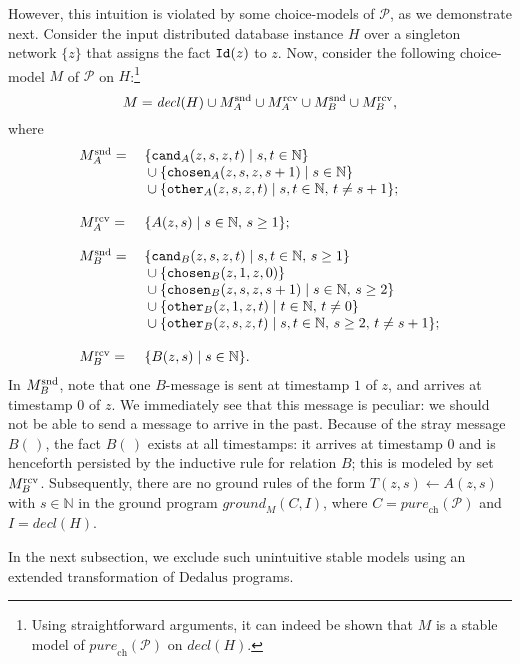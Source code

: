 \documentclass{tlp}
\newcommand{\langname}[1]{\text{#1}}  \newcommand{\pred}[1]{\mathtt{#1}}  \newcommand{\fname}[1]{\mathit{#1}}  \newcommand{\sq}[1]{`{#1}'}
\newcommand{\dedalus}{\langname{Dedalus}}
\newcommand{\Nat}{\mathbb{N}}  \newcommand{\len}[1]{|#1|} \newcommand{\rom}[1]{\text{\emph{(#1)}}} \newcommand{\romI}{\rom i}
\newcommand{\ded}{\mathcal{P}}
\newcommand{\ntup}{(\,)}
\newcommand{\grp}[3]{\fname{ground}_{#1}(#2,#3)}
\newcommand{\chosen}{\pred{chosen}}
\newcommand{\other}{\pred{other}}
\newcommand{\cand}{\pred{cand}}
\newcommand{\purech}[1]{\fname{pure}_{\mathrm{ch}}(#1)}
\newcommand{\decl}[1]{\fname{decl}(#1)}
\begin{document}
However, this intuition is violated by some choice-models of $\ded$,
as we demonstrate next. Consider the input distributed database instance
$H$ over a singleton network $\{z\}$ that assigns the fact $\relid(z)$
to $z$. Now, consider the following choice-model $M$ of $\ded$
on $H$:\footnote{Using straightforward arguments, it can indeed be shown that $M$
is a stable model of $\purech{\ded}$ on $\decl H$.}
\[
M=\decl H\cup M_{A}^{\lsnd}\cup M_{A}^{\lrcv}\cup M_{B}^{\lsnd}\cup M_{B}^{\lrcv},
\]
where 
    \[
    \begin{array}{ll}
    M_A^\lsnd = {} & \{\cand_A(z,s,z,t)\mid s,t\in\Nat\} \\
                & {}\cup \{\chosen_A(z,s,z,s+1)\mid s\in\Nat\} \\
                & {}\cup \{\other_A(z,s,z,t)\mid s,t\in\Nat,\, t\neq s+1\};\\   
    \\
    M_A^\lrcv = {} & \{A(z,s)\mid s\in\Nat,\, s\geq 1\}; \\
    \\
    M_B^\lsnd = {} & \{\cand_B(z,s,z,t)\mid s,t\in\Nat,\, s\geq 1\} \\
                & {}\cup \{\chosen_B(z,1,z,0)\} \\
                & {}\cup \{\chosen_B(z,s,z,s+1)\mid s\in\Nat,\, s\geq 2\} \\
                & {}\cup \{\other_B(z,1,z,t)\mid t\in\Nat,\, t\neq 0\} \\
                & {}\cup \{\other_B(z,s,z,t)\mid s,t\in\Nat,\, s\geq 2,\, t\neq s+1\};\\
    \\
    M_B^\lrcv = {} & \{B(z,s)\mid s\in\Nat\}.
    \end{array}
    \]    
In $M_{B}^{\mathrm{snd}}$, note that one
$B$-message is sent at timestamp $1$ of $z$, and arrives at timestamp
$0$ of $z$. We immediately see that this message is peculiar: we
should not be able to send a message to arrive in the past. Because
of the stray message $B\ntup$, the fact $B\ntup$ exists at all timestamps:
it arrives at timestamp $0$ and is henceforth persisted by the inductive
rule for relation $B$; this is modeled by set $M_{B}^{\mathrm{rcv}}$. Subsequently,
there are no ground rules of the form $T(z,s)\gets A(z,s)$ with $s\in\Nat$
in the ground program $\grp MCI$, where $C=\purech{\ded}$ and $I=\decl H$.

In the next subsection, we exclude such unintuitive stable models
using an extended transformation of $\dedalus$ programs.
\end{document}
